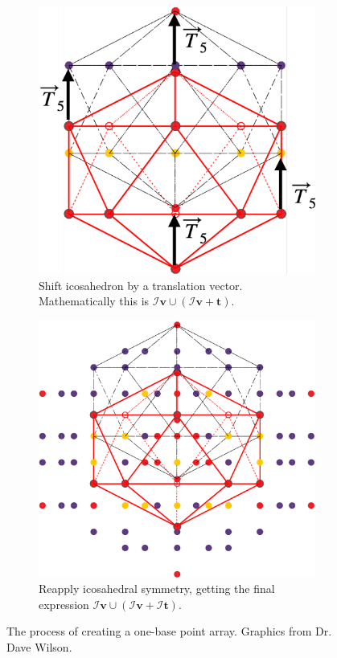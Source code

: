 \documentclass[a4paper,10pt]{article}
\theoremstyle{plain}
\theoremstyle{definition}
\theoremstyle{remark}
\renewcommand{\vec}[1]{\mathbf{#1}}
\begin{document}
\begin{figure}[h!]
\begin{subfigure}{0.3\textwidth}
		\includegraphics[width=\textwidth]{images/p_arr_construction_2.pdf}
		\caption{Shift icosahedron by a translation vector. Mathematically this is \mbox{\(\mathcal{I}\vec{v} \cup (\mathcal{I}\vec{v} + \vec{t})\)}.}
	\end{subfigure}
	\hfill
	\begin{subfigure}{0.35\textwidth}
		\centering
		\includegraphics[width=\textwidth]{images/p_arr_construction_3.pdf}
		\caption{Reapply icosahedral symmetry, getting the final expression \(\mathcal{I}\vec{v} \cup (\mathcal{I}\vec{v} + \mathcal{I}\vec{t})\).}
	\end{subfigure}
	\caption{The process of creating a one-base point array. Graphics from Dr. Dave Wilson.}
	\label{fig:point_array_construction}
\end{figure}
\end{document}
